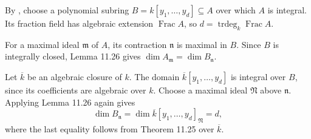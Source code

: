 By , choose a polynomial subring $B=k[y_1,\ldots,y_d]\subseteq A$ over which $A$ is integral. Its fraction field has algebraic extension $\operatorname{Frac}A$, so $d=\operatorname{trdeg}_k\operatorname{Frac}A$.

For a maximal ideal $\mathfrak m$ of $A$, its contraction $\mathfrak n$ is maximal in $B$. Since $B$ is integrally closed, Lemma 11.26 gives $\dim A_{\mathfrak m}=\dim B_{\mathfrak n}$.

Let $\overline k$ be an algebraic closure of $k$. The domain $\overline k[y_1,\ldots,y_d]$ is integral over $B$, since its coefficients are algebraic over $k$. Choose a maximal ideal $\mathfrak N$ above $\mathfrak n$. Applying Lemma 11.26 again gives
\[\dim B_{\mathfrak n}=\dim\overline k[y_1,\ldots,y_d]_{\mathfrak N}=d,\]
where the last equality follows from Theorem 11.25 over $\overline k$.
